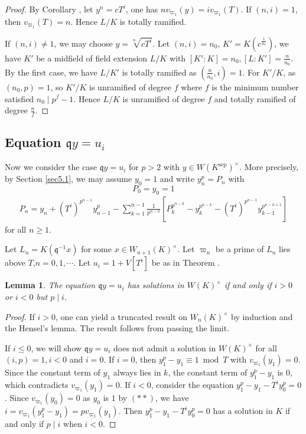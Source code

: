 \documentclass{proc-l}
\newtheorem{lemma}[theorem]{Lemma}
\theoremstyle{definition}
\theoremstyle{remark}
\numberwithin{equation}{section}
\DeclareMathOperator{\sep}{sep}
\begin{document}
{\begin{proof}
By Corollary \boxed{\ref{4.2}}, let $y^{n}=cT^i$, one has $nv_{\varpi_1}(y)=iv_{\varpi_1}(T)$. If $(n,i)=1$, then $v_{\varpi_1}(T)=n$. Hence $L/K$ is totally ramified.

If $(n,i)\neq1$, we may choose $y=\sqrt[n]{cT^i}$. Let $(n,i)=n_0$, $K'=K(c^{\frac{1}{n_0}})$, we have $K'$ be a midfield of field extension $L/K$ with $[K':K]=n_0,[L:K']=\frac{n}{n_0}$. By the first case, we have $L/K'$ is totally ramified as $(\frac{n}{n_0},i)=1$. For $K'/K$, as $(n_0,p)=1$, so $K'/K$ is unramified of degree $f$ where $f$ is the minimum number satisfied $n_0\mid p^f-1$. Hence $L/K$ is unramified of degree $f$ and totally ramified of degree $\frac{n}{f}$. 
\end{proof}
\subsection{Equation $\mathfrak qy=u_i$}\label{5.2}
Now we consider the case $\mathfrak qy=u_i$ for $p>2$ with $y\in W(K^{\sep})^\times$. More precisely, by Section \ref{sec5.1}, we may assume $y_0=1$ and write $y_n^p=P_n$ with $$P_0=y_0=1$$
\begin{align}
P_{n}=y_n+(T^i)^{p^{n-1}}y_{n-1}^p-\sum_{k=1}^{n-1}\frac{1}{p^{n-k}}[P_{k}^{p^{n-k}}-y_k^{p^{n-k}}-(T^i)^{p^{n-1}}y_{k-1}^{p^{n-k+1}}]\tag{**}
\end{align}
for all $n\geq1$. 

Let $L_n=K(\mathfrak q^{-1}x)$ for some $x\in W_{n+1}(K)^\times$. Let $\varpi_n$ be a prime of $L_n$ lies above $T$,$n=0,1,\cdots$. Let $u_i=1+V[T^i]$ be as in Theorem \boxed{\ref{037}}.
\begin{lemma}
    
{\label{39}}
The equation $\mathfrak qy=u_i$ has solutions in $W(K)^\times$ if and only if $i>0$ or $i<0$ but $p\mid i$.
\end{lemma}}

\begin{proof}
If $i>0$, one can yield a truncated result on $W_n(K)^\times$ by induction and the Hensel's lemma. The result follows from passing the limit.

If $i\leq 0$, we will show $\mathfrak qy=u_i$ does not admit a solution in $W(K)^\times$ for all $(i,p)=1,i<0$ and $i=0$. If $i=0$, then $y_1^p-y_1\equiv 1\bmod T$ with $v_{\varpi_1}(y_1)=0$. Since the constant term of $y_1$ always lies in $k$, the constant term of $y_1^p-y_1$ is $0$, which contradicts $v_{\varpi_1}(y_1)=0$. If $i<0$, consider the equation $y_{1}^p-y_{1}-T^iy_{0}^p=0$. Since $v_{\varpi_1}(y_{0})=0$ as $y_0$ is $1$ by $(**)$, we have $i=v_{\varpi_1}(y_{1}^{p}-y_{1})=pv_{\varpi_1}(y_{1})$. Then $y_{1}^p-y_{1}-T^iy_{0}^p=0$ has a solution in $K$ if and only if $p\mid i$ when $i<0$.
\end{proof}
\end{document}
